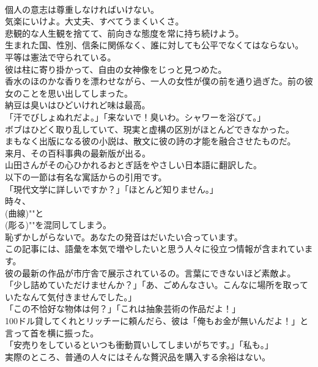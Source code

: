 \documentclass[8pt]{extreport}
\begin{document}
\begin{CJK}{UTF8}{min}
\\	個人の意志は尊重しなければいけない。
\\	気楽にいけよ。大丈夫、すべてうまくいくさ。
\\	悲観的な人生観を捨てて、前向きな態度を常に持ち続けよう。
\\	生まれた国、性別、信条に関係なく、誰に対しても公平でなくてはならない。
\\	平等は憲法で守られている。
\\	彼は柱に寄り掛かって、自由の女神像をじっと見つめた。
\\	香水のほのかな香りを漂わせながら、一人の女性が僕の前を通り過ぎた。前の彼女のことを思い出してしまった。
\\	納豆は臭いはひどいけれど味は最高。
\\	「汗でびしょぬれだよ。」「来ないで！臭いわ。シャワーを浴びて。」
\\	ボブはひどく取り乱していて、現実と虚構の区別がほとんどできなかった。
\\	まもなく出版になる彼の小説は、散文に彼の詩の才能を融合させたものだ。
\\	来月、その百科事典の最新版が出る。
\\	山田さんがその心ひかれるおとぎ話をやさしい日本語に翻訳した。
\\	以下の一節は有名な寓話からの引用です。
\\	「現代文学に詳しいですか？」「ほとんど知りません。」
\\	時々、
\\	(曲線)""と
\\	(彫る)""を混同してしまう。
\\	恥ずかしがらないで。あなたの発音はだいたい合っています。
\\	この記事には、語彙を本気で増やしたいと思う人々に役立つ情報が含まれています。
\\	彼の最新の作品が市庁舎で展示されているの。言葉にできないほど素敵よ。
\\	「少し詰めていただけませんか？」「あ、ごめんなさい。こんなに場所を取っていたなんて気付きませんでした。」
\\	「この不恰好な物体は何？」「これは抽象芸術の作品だよ！」
\\	100ドル貸してくれとリッチーに頼んだら、彼は「俺もお金が無いんだよ！」と言って首を横に振った。
\\	「安売りをしているといつも衝動買いしてしまいがちです。」「私も。」
\\	実際のところ、普通の人々にはそんな贅沢品を購入する余裕はない。

\end{CJK}
\end{document}
